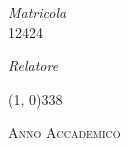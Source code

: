 \begin{titlepage}
\begin{center}
\begin{large}
\vspace{0pt} 

\begin{flushleft}
\begin{flushright}
\textit{Matricola}\\ 
12424
\end{flushright}
\end{flushleft}

\vspace{0pt} 

\begin{flushleft}
\textit{Relatore}\\ 
\profTitle \myProf
\end{flushleft}

\end{large}

\vspace{0pt}

\line(1, 0){338} \\
\begin{normalsize}
\textsc{Anno Accademico \myAA}
\end{normalsize}

\end{center}
\end{titlepage} 
